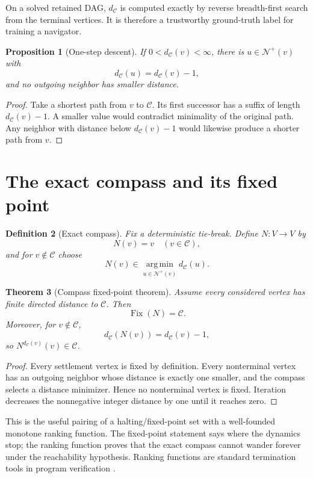 \documentclass[11pt]{article}
\newtheorem{definition}{Definition}[section]
\newtheorem{theorem}[definition]{Theorem}
\newtheorem{proposition}[definition]{Proposition}
\newcommand{\Cset}{\mathcal C}
\newcommand{\N}{\mathcal N}
\begin{document}
On a solved retained DAG, $d_{\Cset}$ is computed exactly by reverse breadth-first search from the terminal vertices. It is therefore a trustworthy ground-truth label for training a navigator.

\begin{proposition}[One-step descent]
If $0<d_{\Cset}(v)<\infty$, there is $u\in\N^+(v)$ with
\[
d_{\Cset}(u)=d_{\Cset}(v)-1,
\]
and no outgoing neighbor has smaller distance.
\end{proposition}
\begin{proof}
Take a shortest path from $v$ to $\Cset$. Its first successor has a suffix of length $d_{\Cset}(v)-1$. A smaller value would contradict minimality of the original path. Any neighbor with distance below $d_{\Cset}(v)-1$ would likewise produce a shorter path from $v$.
\end{proof}

\section{The exact compass and its fixed point}
\begin{definition}[Exact compass]
Fix a deterministic tie-break. Define $N:V\to V$ by
\[
N(v)=v\quad(v\in\Cset),
\]
and for $v\notin\Cset$ choose
\[
N(v)\in\operatorname*{arg\,min}_{u\in\N^+(v)}d_{\Cset}(u).
\]
\end{definition}

\begin{theorem}[Compass fixed-point theorem]
Assume every considered vertex has finite directed distance to $\Cset$. Then
\[
\boxed{\operatorname{Fix}(N)=\Cset.}
\]
Moreover, for $v\notin\Cset$,
\[
d_{\Cset}(N(v))=d_{\Cset}(v)-1,
\]
so $N^{d_{\Cset}(v)}(v)\in\Cset$.
\end{theorem}
\begin{proof}
Every settlement vertex is fixed by definition. Every nonterminal vertex has an outgoing neighbor whose distance is exactly one smaller, and the compass selects a distance minimizer. Hence no nonterminal vertex is fixed. Iteration decreases the nonnegative integer distance by one until it reaches zero.
\end{proof}

This is the useful pairing of a halting/fixed-point set with a well-founded monotone ranking function. The fixed-point statement says where the dynamics stop; the ranking function proves that the exact compass cannot wander forever under the reachability hypothesis. Ranking functions are standard termination tools in program verification \cite{bradley2005,leike2014}.
\end{document}

